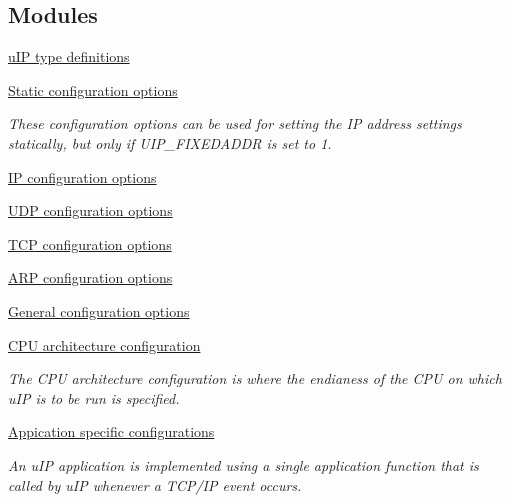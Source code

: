 \subsection*{Modules}
\begin{CompactItemize}
\item 
\hyperlink{a00070}{u\-IP type definitions}
\item 
\hyperlink{a00071}{Static configuration options}
\begin{CompactList}\small\item\em These configuration options can be used for setting the IP address settings statically, but only if UIP\_\-FIXEDADDR is set to 1. \item\end{CompactList}

\item 
\hyperlink{a00072}{IP configuration options}
\item 
\hyperlink{a00073}{UDP configuration options}
\item 
\hyperlink{a00074}{TCP configuration options}
\item 
\hyperlink{a00075}{ARP configuration options}
\item 
\hyperlink{a00076}{General configuration options}
\item 
\hyperlink{a00077}{CPU architecture configuration}
\begin{CompactList}\small\item\em The CPU architecture configuration is where the endianess of the CPU on which u\-IP is to be run is specified. \item\end{CompactList}

\item 
\hyperlink{a00078}{Appication specific configurations}
\begin{CompactList}\small\item\em An u\-IP application is implemented using a single application function that is called by u\-IP whenever a TCP/IP event occurs. \item\end{CompactList}

\end{CompactItemize}
